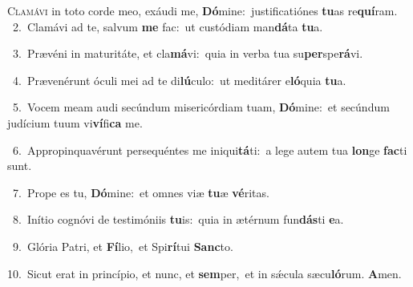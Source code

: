 \lettrine{\initial\textcolor{\initialcolor}{C}}{lamávi} in toto corde meo, exáudi me, \textbf{Dó}\-mine:~\star justificatiónes \textbf{tu}\-as re\-\textbf{quí}\-ram.\\
{\numbfont\textcolor{\numbcolor}{~2.}}~Clamávi ad te, salvum \textbf{me} fac:~\star ut custódiam man\-\textbf{dá}\-ta \textbf{tu}\-a.\par
{\numbfont\textcolor{\numbcolor}{~3.}}~Prævéni in maturitáte, et cla\-\textbf{má}\-vi:~\star quia in verba tua su\-\textbf{per}\-spe\-\textbf{rá}\-vi.\par
{\numbfont\textcolor{\numbcolor}{~4.}}~Prævenérunt óculi mei ad te di\-\textbf{lú}\-culo:~\star ut meditárer e\-\textbf{ló}\-quia \textbf{tu}\-a.\par
{\numbfont\textcolor{\numbcolor}{~5.}}~Vocem meam audi secúndum misericórdiam tuam, \textbf{Dó}\-mine:~\star et secúndum judícium tuum vi\-\textbf{ví}\-fi\textbf{ca} me.\par
{\numbfont\textcolor{\numbcolor}{~6.}}~Appropinquavérunt persequéntes me iniqui\-\textbf{tá}\-ti:~\star a lege autem tua \textbf{lon}\-ge \textbf{fac}\-ti sunt.\par
{\numbfont\textcolor{\numbcolor}{~7.}}~Prope es tu, \textbf{Dó}\-mine:~\star et omnes viæ \textbf{tu}\-æ \textbf{vé}\-ritas.\par
{\numbfont\textcolor{\numbcolor}{~8.}}~Inítio cognóvi de testimóniis \textbf{tu}\-is:~\star quia in ætérnum fun\-\textbf{dás}\-ti \textbf{e}\-a.\par
{\numbfont\textcolor{\numbcolor}{~9.}}~Glória Patri, et \textbf{Fí}\-lio,~\star et Spi\-\textbf{rí}\-tui \textbf{Sanc}\-to.\par
{\numbfont\textcolor{\numbcolor}{10.}}~Sicut erat in princípio, et nunc, et \textbf{sem}\-per,~\star et in sǽcula sæcu\-\textbf{ló}\-rum. \textbf{A}\-men.\par
